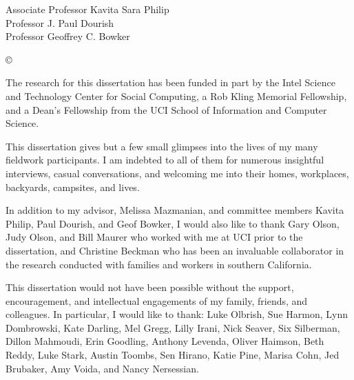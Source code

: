 



\othercommitteemembers
{
  Associate Professor Kavita Sara Philip\\
  Professor J. Paul Dourish\\
  Professor Geoffrey C. Bowker
}


\copyrightdeclaration
{
  © {\Degreeyear} \Authorname
}


%

\acknowledgments
{
The research for this dissertation has been funded in part by the Intel Science and Technology Center for Social Computing, a Rob Kling Memorial Fellowship, and a Dean's Fellowship from the UCI School of Information and Computer Science. 
	
This dissertation gives but a few small glimpses into the lives of my many fieldwork participants. I am indebted to all of them for numerous insightful interviews, casual conversations, and welcoming me into their homes, workplaces, backyards, campsites, and lives.
  
In addition to my advisor, Melissa Mazmanian, and committee members Kavita Philip, Paul Dourish, and Geof Bowker, I would also like to thank Gary Olson, Judy Olson, and Bill Maurer who worked with me at UCI prior to the dissertation, and Christine Beckman who has been an invaluable collaborator in the research conducted with families and workers in southern California.

This dissertation would not have been possible without the support, encouragement, and intellectual engagements of my family, friends, and colleagues. In particular, I would like to thank: Luke Olbrish, Sue Harmon, Lynn Dombrowski, Kate Darling, Mel Gregg, Lilly Irani, Nick Seaver, Six Silberman, Dillon Mahmoudi, Erin Goodling, Anthony Levenda, Oliver Haimson, Beth Reddy, Luke Stark, Austin Toombs, Sen Hirano, Katie Pine, Marisa Cohn, Jed Brubaker, Amy Voida, and Nancy Nersessian. 
 }


